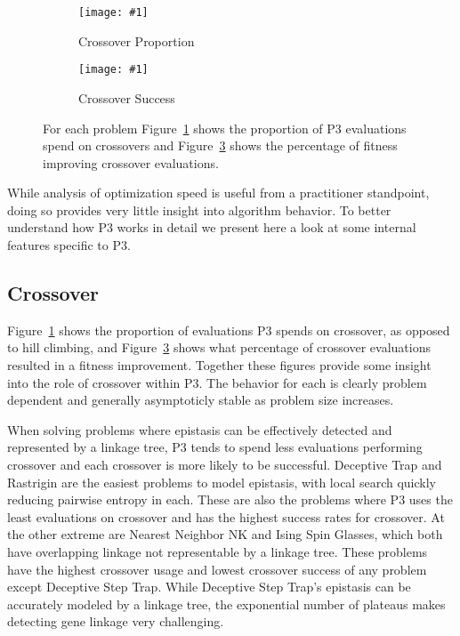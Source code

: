 \documentclass[twoside]{article}
\newcommand{\includegraphicsfit}[1]
{\texttt{[image: \#1]}}
\begin{document}
\begin{figure}[t]
  \begin{centering}
    \begin{subfigure}{.5\textwidth}
      \begin{centering}
        \includegraphicsfit{cross}
      \end{centering}
      \caption{Crossover Proportion}
      \label{fig-cross}
    \end{subfigure}%
    \begin{subfigure}{.5\textwidth}
      \begin{centering}
        \includegraphicsfit{cross-success}
      \end{centering}
      \caption{Crossover Success}
      \label{fig-cross-success}
    \end{subfigure}
  \end{centering}
  \caption{For each problem Figure~\ref{fig-cross} shows the proportion of P3 evaluations spend on crossovers
           and Figure~\ref{fig-cross-success} shows the percentage of fitness improving crossover evaluations.}
\end{figure}

While analysis of optimization speed is useful from a practitioner standpoint, doing so provides very
little insight into algorithm behavior. To better understand how P3 works in detail we present here
a look at some internal features specific to P3.

\subsection{Crossover}
Figure~\ref{fig-cross} shows the proportion of evaluations P3 spends on crossover, as opposed to hill climbing,
and Figure~\ref{fig-cross-success} shows what percentage of crossover evaluations resulted in a fitness improvement.
Together these figures provide some insight into the role of crossover within P3. The behavior
for each is clearly problem dependent and generally asymptoticly stable as problem size increases.

When solving problems where epistasis can be effectively detected and represented by a linkage tree, P3 tends to spend
less evaluations performing crossover and each crossover is more likely to be successful.
Deceptive Trap and Rastrigin are the easiest problems to model epistasis, with local search quickly
reducing pairwise entropy in each. These are also the problems where P3 uses the least evaluations
on crossover and has the highest success rates for crossover. At the other extreme are Nearest Neighbor
NK and Ising Spin Glasses, which both have overlapping linkage not representable by a linkage tree.
These problems have the highest crossover usage and lowest crossover success of any problem except Deceptive
Step Trap.  While Deceptive Step Trap's epistasis can be accurately modeled by a linkage tree, the
exponential number of plateaus makes detecting gene linkage very challenging.
\end{document}
